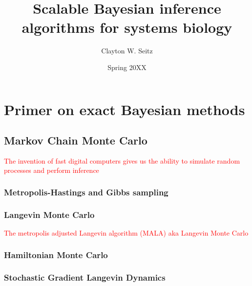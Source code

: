 \documentclass{ucetd}
\title{Scalable Bayesian inference algorithms for systems biology}
\author{Clayton W. Seitz}
\date{Spring 20XX}
\begin{document}
\maketitle

\makecopyright


\tableofcontents


\abstract



\clearpage

\mainmatter

\chapter{Primer on exact Bayesian methods}

\section{Markov Chain Monte Carlo}

\textcolor{red}{The invention of fast digital computers gives us the ability to simulate random processes and perform inference}

\subsection{Metropolis-Hastings and Gibbs sampling}

\subsection{Langevin Monte Carlo} 

\textcolor{red}{The metropolis adjusted Langevin algorithm (MALA) aka Langevin Monte Carlo}

\subsection{Hamiltonian Monte Carlo}

\subsection{Stochastic Gradient Langevin Dynamics}
\end{document}
